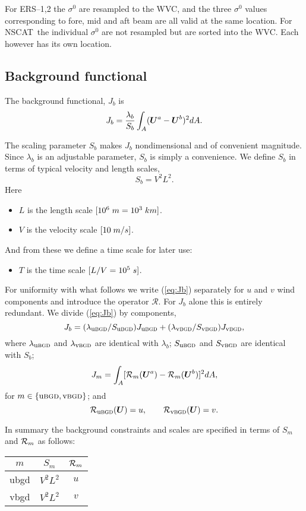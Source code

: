 \documentclass[11pt]{article}
\newcommand{\ers}[1]{ERS--{#1}}
\newcommand{\glm}[1]{\mbox{$ \lambda_{\mbox{\tiny #1}} $}}
\newcommand{\gl}[1]{\mbox{$ \lambda_{#1} $}}
\newcommand{\Jm}[1]{\mbox{$ J_{\mbox{\tiny #1}} $}}
\newcommand{\J}[1]{\mbox{$ J_{#1} $}}
\newcommand{\mks}[2]{\mbox{$ {#1} \; {#2} $}}
\newcommand{\nscat}{NSCAT}
\newcommand{\s}[1]{\mbox{$ \sigma^{#1} $}}
\newcommand{\Vector}[1]{\mbox{\boldmath ${#1}$}}
\newcommand{\xxx}[1]{\subsection {#1}}
\newcommand{\eql}[2]{\begin{equation} \label{eq:#1} #2 \end{equation}}
\newcommand{\eqr}[1]{(\ref{eq:#1})}
\newcommand{\vardef}[3]{\item $ {#1} $ is the {#2} $ [{#3}] $. }
\newcommand{\subsc}[2]{\mbox{$ #1_{\mbox{\sc \footnotesize #2}} $}}
\renewcommand{\Jm}[1]{\subsc{J}{{#1}}}
\newcommand{\Sm}[1]{\subsc{S}{{#1}}}
\renewcommand{\glm}[1]{\subsc{\lambda}{{#1}}}
\newcommand{\Operator}[1]{\mbox{$ \mathcal #1 $}}
\newcommand{\glmsm}[1]{(\glm{{#1}}/\Sm{{#1}})}
\newcommand{\bgd}[1]{\mbox{{\rm #1}{\sc bgd}}}
\begin{document}
For \ers1,2 the \s0 are resampled to the WVC, and the three \s0 values
corresponding to fore, mid and aft beam are all valid at the same
location.  For \nscat\ the individual \s0 are not resampled but are
sorted into the WVC.  Each however has its own location.

\xxx {Background functional}

The background functional, \J{b} is
 \eql{Jb}{
  J_b = \frac{\gl{b}}{S_b} \int_A (\Vector{U}^a -\Vector{U}^b)^2 dA . }

The scaling parameter $S_b$ makes \J{b} nondimensional and of
convenient magnitude.  Since \gl{b} is an adjustable parameter, $S_b$
is simply a convenience.  We define $S_b$ in terms of typical velocity
and length scales,
 \eql{Sb}{ S_b = V^2 L^2 . }
 Here \begin{itemize}
  \vardef{L}{length scale}{\mks{\mks{10^6}{m} = 10^3}{km}}
  \vardef{V}{velocity scale}{\mks{10}{m/s}}
 \end{itemize} 
 And from these we define a time scale for later use:
 \begin{itemize}
  \vardef{T}{time scale}{\mks{L/V = 10^5}{s}}
 \end{itemize} 

For uniformity with what follows we write \eqr{Jb} separately for $u$ and
$v$ wind components and introduce the operator \Operator{R}.  For
\J{b} alone this is entirely redundant.  We divide \eqr{Jb} by components,
 \eql{Jbuv}{
  J_b = \glmsm{\bgd{u}} \Jm{\bgd{u}} + \glmsm{\bgd{v}} \Jm{\bgd{v}} , }
 where \glm{\bgd{u}} and \glm{\bgd{v}} are identical with \gl{b}; 
\subsc{S}{\bgd{u}} and \subsc{S}{\bgd{v}} are identical with $S_b$;
 \eql{Jm}{ \J{m} = \int_A [\Operator{R}_m(\Vector{U}^a) -
   \Operator{R}_m(\Vector{U}^b)]^2 dA , }
 for $ m \in \{ \bgd{u}, \bgd{v} \}$; and
 \eql{Rbgd}{ \subsc{\Operator{R}}{\bgd{u}}(\Vector{U}) = u , \qquad
          \subsc{\Operator{R}}{\bgd{v}}(\Vector{U}) = v . }

In summary the background constraints and scales are specified in
terms of $S_m$ and $\Operator{R}_m$ as follows:
 \begin{center}
 \begin{tabular}[hbt]{|c|c|c|} \hline \hline
  $m$ & $S_m$ & $\Operator{R}_m$ \\ \hline
  \bgd{u} & $ V^2 L^2 $ & $u$ \\
  \bgd{v} & $ V^2 L^2 $ & $v$ \\
  \hline
 \end{tabular}
 \end{center}
\end{document}
